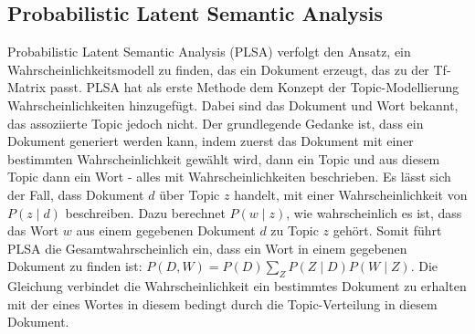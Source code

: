 \documentclass[german,version-2020-11]{uzl-thesis}
\begin{document}
\subsection{Probabilistic Latent Semantic Analysis}
Probabilistic Latent Semantic Analysis (PLSA) verfolgt den Ansatz, ein Wahrscheinlichkeitsmodell zu finden, das ein Dokument erzeugt, das zu der Tf-Matrix passt. PLSA hat als erste Methode dem Konzept der Topic-Modellierung Wahrscheinlichkeiten hinzugefügt. Dabei sind das Dokument und Wort bekannt, das assoziierte Topic jedoch nicht. Der grundlegende Gedanke ist, dass ein Dokument generiert werden kann, indem zuerst das Dokument mit einer bestimmten Wahrscheinlichkeit gewählt wird, dann ein Topic und aus diesem Topic dann ein Wort - alles mit Wahrscheinlichkeiten beschrieben. Es lässt sich der Fall, dass Dokument $d$ über Topic $z$ handelt, mit einer Wahrscheinlichkeit von $P(z \mid d)$ beschreiben. Dazu berechnet $P(w \mid z)$, wie wahrscheinlich es ist, dass das Wort $w$ aus einem gegebenen Dokument $d$ zu Topic $z$ gehört. Somit führt PLSA die Gesamtwahrscheinlich ein, dass ein Wort in einem gegebenen Dokument zu finden ist: $P(D,W) = P(D) \sum_{Z}{P(Z\mid D)P(W\mid Z)}$. Die Gleichung verbindet die Wahrscheinlichkeit ein bestimmtes Dokument zu erhalten mit der eines Wortes in diesem bedingt durch die Topic-Verteilung in diesem Dokument. 
\end{document}
